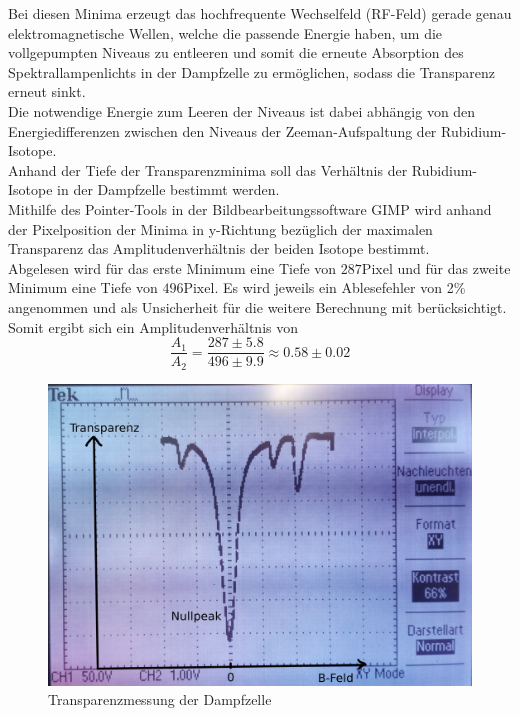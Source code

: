 Bei diesen Minima erzeugt das hochfrequente Wechselfeld (RF-Feld) gerade genau elektromagnetische Wellen, welche die passende Energie haben, um die vollgepumpten Niveaus zu entleeren und somit die erneute Absorption des Spektrallampenlichts in der Dampfzelle zu ermöglichen, sodass die Transparenz erneut sinkt.\\
Die notwendige Energie zum Leeren der Niveaus ist dabei abhängig von den Energiedifferenzen zwischen den Niveaus der Zeeman-Aufspaltung der Rubidium-Isotope.\\
Anhand der Tiefe der Transparenzminima soll das Verhältnis der Rubidium-Isotope in der Dampfzelle bestimmt werden.\\
Mithilfe des Pointer-Tools in der Bildbearbeitungssoftware GIMP \cite{gimp} wird anhand der Pixelposition der Minima in y-Richtung bezüglich der maximalen Transparenz das Amplitudenverhältnis der beiden Isotope bestimmt.\\
Abgelesen wird für das erste Minimum eine Tiefe von $287 \mathrm{ Pixel}$ und für das zweite Minimum eine Tiefe von $496 \mathrm{ Pixel}$. Es wird jeweils ein Ablesefehler von 2\% angenommen und als Unsicherheit für die weitere Berechnung mit berücksichtigt.\\
Somit ergibt sich ein Amplitudenverhältnis von
\begin{equation*}
  \frac{A_1}{A_2}=\frac{287 \pm5.8}{496 \pm 9.9}\approx 0.58\pm 0.02
\end{equation*}
\begin{figure}
  \centering
  \includegraphics[width=0.9\columnwidth]{pictures/oszilloskop.jpg}
  \caption{Transparenzmessung der Dampfzelle}
  \label{fig:oszi}
\end{figure}

